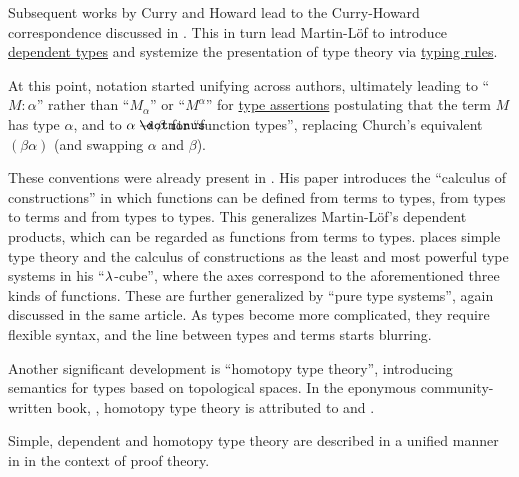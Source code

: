 \begin{remark}
  Subsequent works by Curry and Howard lead to the Curry-Howard correspondence discussed in . This in turn lead Martin-Löf to introduce \hyperref[rem:dependent_type]{dependent types} and systemize the presentation of type theory via \hyperref[def:typing_rule]{typing rules}.

  At this point, notation started unifying across authors, ultimately leading to \enquote{\( M: \alpha \)} rather than \enquote{\( M_\alpha \)} or \enquote{\( M^\alpha \)} for \hyperref[def:type_assertion]{type assertions} postulating that the term \( M \) has type \( \alpha \), and to \( \alpha \synimplies \beta \) for \enquote{function types}, replacing Church's equivalent \( (\beta\alpha) \) (and swapping \( \alpha \) and \( \beta \)).

  These conventions were already present in . His paper introduces the \enquote{calculus of constructions} in which functions can be defined from terms to types, from types to terms and from types to types. This generalizes Martin-L\"of's dependent products, which can be regarded as functions from terms to types.  places simple type theory and the calculus of constructions as the least and most powerful type systems in his \enquote{\( \mathrm{\lambda} \)-cube}, where the axes correspond to the aforementioned three kinds of functions. These are further generalized by \enquote{pure type systems}, again discussed in the same article. As types become more complicated, they require flexible syntax, and the line between types and terms starts blurring.

  Another significant development is \enquote{homotopy type theory}, introducing semantics for types based on topological spaces. In the eponymous community-written book, \cite{UnivalentProject2024OctoberHoTT}, homotopy type theory is attributed to \cite{Voevodski2006HoTT} and \cite{AwodeyWarren2009HoTT}.

  Simple, dependent and homotopy type theory are described in a unified manner in \cite{Mimram2020Types} in the context of proof theory.
\end{remark}

